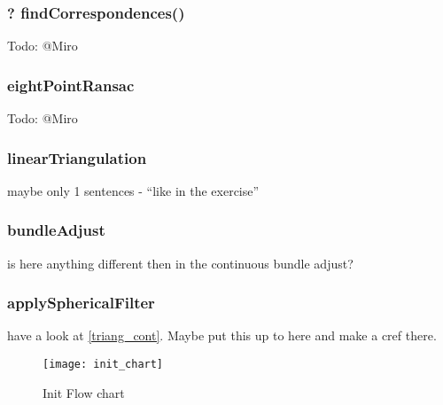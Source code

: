 \subsubsection{? findCorrespondences()}
Todo: @Miro

\subsubsection{eightPointRansac}
Todo: @Miro

\subsubsection{linearTriangulation}
maybe only 1 sentences - ``like in the exercise''

\subsubsection{bundleAdjust}
is here anything different then in the continuous bundle adjust?

\subsubsection{applySphericalFilter}
have a look at \cref{triang_cont}. Maybe put this up to here and make a cref there.

\begin{figure}[ht]
	\centering
	\texttt{[image: init\_chart]}
	\caption{Init Flow chart}
	\label{img_flow_init}
\end{figure}